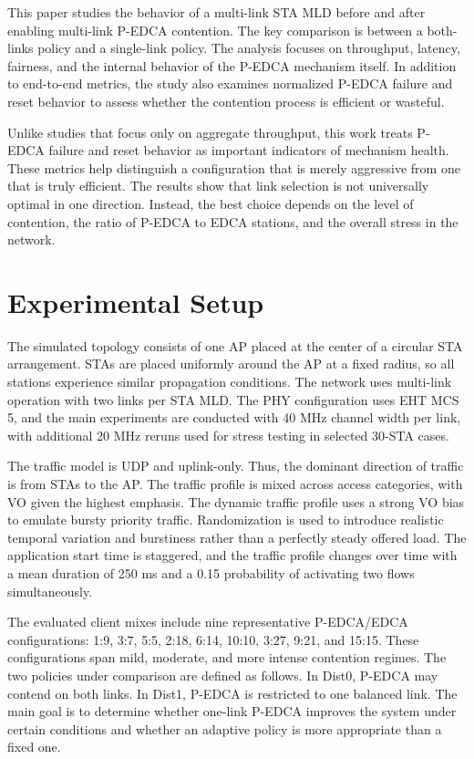 \documentclass[conference]{IEEEtran}
\begin{document}
This paper studies the behavior of a multi-link STA MLD before and after enabling multi-link P-EDCA contention. The key comparison is between a both-links policy and a single-link policy. The analysis focuses on throughput, latency, fairness, and the internal behavior of the P-EDCA mechanism itself. In addition to end-to-end metrics, the study also examines normalized P-EDCA failure and reset behavior to assess whether the contention process is efficient or wasteful.

Unlike studies that focus only on aggregate throughput, this work treats P-EDCA failure and reset behavior as important indicators of mechanism health. These metrics help distinguish a configuration that is merely aggressive from one that is truly efficient. The results show that link selection is not universally optimal in one direction. Instead, the best choice depends on the level of contention, the ratio of P-EDCA to EDCA stations, and the overall stress in the network.

\section{Experimental Setup}
The simulated topology consists of one AP placed at the center of a circular STA arrangement. STAs are placed uniformly around the AP at a fixed radius, so all stations experience similar propagation conditions. The network uses multi-link operation with two links per STA MLD. The PHY configuration uses EHT MCS 5, and the main experiments are conducted with 40 MHz channel width per link, with additional 20 MHz reruns used for stress testing in selected 30-STA cases.

The traffic model is UDP and uplink-only. Thus, the dominant direction of traffic is from STAs to the AP. The traffic profile is mixed across access categories, with VO given the highest emphasis. The dynamic traffic profile uses a strong VO bias to emulate bursty priority traffic. Randomization is used to introduce realistic temporal variation and burstiness rather than a perfectly steady offered load. The application start time is staggered, and the traffic profile changes over time with a mean duration of 250 ms and a 0.15 probability of activating two flows simultaneously.

The evaluated client mixes include nine representative P-EDCA/EDCA configurations: 1:9, 3:7, 5:5, 2:18, 6:14, 10:10, 3:27, 9:21, and 15:15. These configurations span mild, moderate, and more intense contention regimes. The two policies under comparison are defined as follows. In Dist0, P-EDCA may contend on both links. In Dist1, P-EDCA is restricted to one balanced link. The main goal is to determine whether one-link P-EDCA improves the system under certain conditions and whether an adaptive policy is more appropriate than a fixed one.
\end{document}
